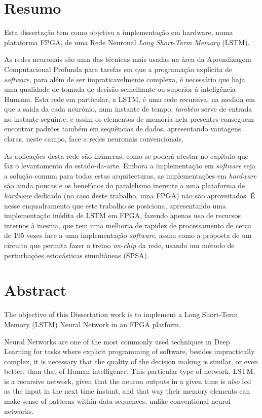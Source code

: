 \chapter*{Resumo}

Esta dissertação tem como objetivo a implementação em hardware, numa plataforma
FPGA, de uma Rede Neuronal \textit{Long Short-Term Memory} (LSTM). 

As redes neuronais são uma das técnicas mais usadas na área da Aprendizagem Computacional Profunda para tarefas em
que a programação explícita de \textit{software}, para além de ser impraticavelmente complexa, é necessário que haja uma qualidade
de tomada de decisão semelhante ou superior à inteligência Humana. Esta rede em particular, a LSTM, é uma rede recursiva, na medida em que a saída
da cada neurónio, num instante de tempo, \emph{também} serve de entrada no instante seguinte, e assim
os elementos de memória nela presentes conseguem encontrar padrões também em sequências de dados,
apresentando vantagens claras, neste campo, face a redes neuronais convencionais.

As aplicações desta rede são inúmeras, como se poderá atestar no capítulo
que faz o levantamento do estado-da-arte. Embora a implementação em \textit{software}
seja a solução comum para todas estas arquitecturas, as implementações em \textit{hardware}
são ainda poucas e os benefícios do paralelismo inerente a uma plataforma de \textit{hardware} dedicado (no caso deste trabalho, uma FPGA) não
são aproveitados. É nesse enquadramento que este trabalho se posiciona, apresentando uma implementação inédita de LSTM em FPGA, fazendo apenas uso de 
recursos internos à mesma, que tem uma melhoria de rapidez de processamento de cerca de 195 vezes face 
a uma implementação \textit{software}, assim como a proposta de um circuito que permita fazer o 
treino \textit{on-chip} da rede, usando um método de perturbações estocásticas simultâneas (SPSA).


\chapter*{Abstract}

The objective of this Dissertation work is to implement a Long Short-Term Memory (LSTM) Neural
Network in an FPGA platform.

Neural Networks are one of the most commonly used techniques in Deep Learning for tasks
where explicit programming of software, besides impractically complex, it is necessary that
the quality of the decision making is similar, or even better, than that of Human intelligence.
This particular type of network, LSTM, is a recursive network, given that the neuron outputs in a 
given time is \emph{also} fed as the input in the next time instant, and that way their memory elements can
make sense of patterns within data sequences, unlike conventional neural networks.

